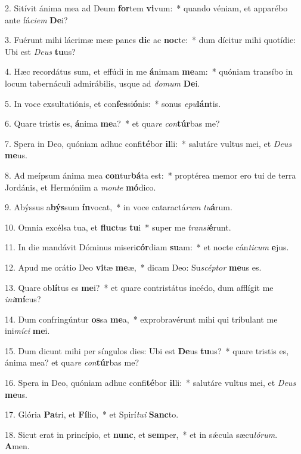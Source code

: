 2. Sitívit ánima mea ad Deum \textbf{for}tem \textbf{vi}vum:~*  quando véniam, et apparébo ante fá\textit{ci}\textit{em} \textbf{De}i?\

3. Fuérunt mihi lácrimæ meæ panes \textbf{di}e ac \textbf{noc}te:~*  dum dícitur mihi quotídie: Ubi est \textit{De}\textit{us} \textbf{tu}us?\

4. Hæc recordátus sum, et effúdi in me \textbf{á}nimam \textbf{me}am:~*  quóniam transíbo in locum tabernáculi admirábilis, usque ad \textit{do}\textit{mum} \textbf{De}i.\

5. In voce exsultatiónis, et con\textbf{fes}si\textbf{ó}nis:~*  sonus \textit{e}\textit{pu}\textbf{lán}tis.\

6. Quare tristis es, \textbf{á}nima \textbf{me}a?~*  et qua\textit{re} \textit{con}\textbf{túr}bas me?\

7. Spera in Deo, quóniam adhuc confi\textbf{té}bor \textbf{il}li:~*  salutáre vultus mei, et \textit{De}\textit{us} \textbf{me}us.\

8. Ad meípsum ánima mea \textbf{con}tur\textbf{bá}ta est:~*  proptérea memor ero tui de terra Jordánis, et Hermóniim a \textit{mon}\textit{te} \textbf{mó}dico.\

9. Abýssus a\textbf{býs}sum \textbf{ín}vocat,~*  in voce cataractá\textit{rum} \textit{tu}\textbf{á}rum.\

10. Omnia excélsa tua, et \textbf{fluc}tus \textbf{tu}i~*  super me \textit{trans}\textit{i}\textbf{é}runt.\

11. In die mandávit Dóminus miseri\textbf{cór}diam \textbf{su}am:~*  et nocte cán\textit{ti}\textit{cum} \textbf{e}jus.\

12. Apud me orátio Deo \textbf{vi}tæ \textbf{me}æ,~*  dicam Deo: Su\textit{scép}\textit{tor} \textbf{me}us es.\

13. Quare ob\textbf{lí}tus es \textbf{me}i?~*  et quare contristátus incédo, dum afflígit me \textit{in}\textit{i}\textbf{mí}cus?\

14. Dum confringúntur \textbf{os}sa \textbf{me}a,~*  exprobravérunt mihi qui tríbulant me ini\textit{mí}\textit{ci} \textbf{me}i.\

15. Dum dicunt mihi per síngulos dies: Ubi est \textbf{De}us \textbf{tu}us?~*  quare tristis es, ánima mea? et qua\textit{re} \textit{con}\textbf{túr}bas me?\

16. Spera in Deo, quóniam adhuc confi\textbf{té}bor \textbf{il}li:~*  salutáre vultus mei, et \textit{De}\textit{us} \textbf{me}us.\

17. Glória \textbf{Pa}tri, et \textbf{Fí}lio,~*  et Spirí\textit{tu}\textit{i} \textbf{Sanc}to.\

18. Sicut erat in princípio, et \textbf{nunc}, et \textbf{sem}per,~*  et in sǽcula sæcu\textit{ló}\textit{rum}. \textbf{A}men.\

